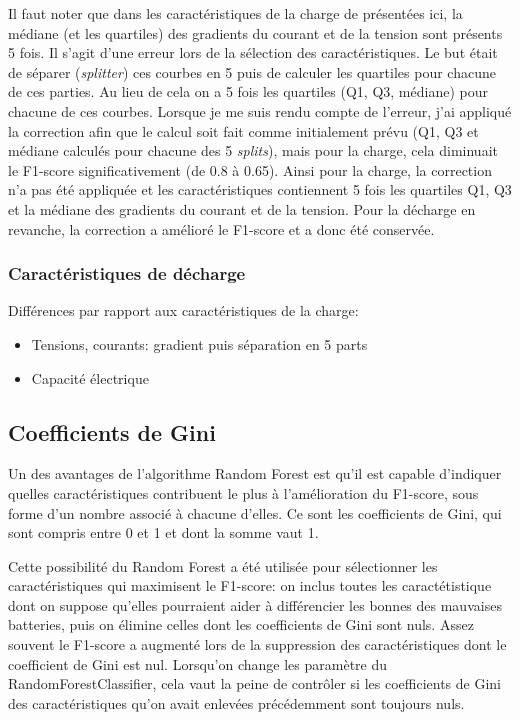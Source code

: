 Il faut noter que dans les caractéristiques de la charge de présentées ici, la médiane (et les quartiles) des gradients du courant et de la tension sont présents 5 fois. Il s'agit d'une erreur lors de la sélection des caractéristiques. Le but était de séparer (\textit{splitter}) ces courbes en 5 puis de calculer les quartiles pour chacune de ces parties. Au lieu de cela on a 5 fois les quartiles (Q1, Q3, médiane) pour chacune de ces courbes. Lorsque je me suis rendu compte de l'erreur, j'ai appliqué la correction afin que le calcul soit fait comme initialement prévu (Q1, Q3 et médiane calculés pour chacune des 5 \textit{splits}), mais pour la charge, cela diminuait le F1-score significativement (de 0.8 à 0.65). Ainsi pour la charge, la correction n'a pas été appliquée et les caractéristiques contiennent 5 fois les quartiles Q1, Q3 et la médiane des gradients du courant et de la tension. Pour la décharge en revanche, la correction a amélioré le F1-score et a donc été conservée.

\subsubsection{Caractéristiques de décharge}
Différences par rapport aux caractéristiques de la charge:
\begin{itemize}
    \item Tensions, courants: gradient puis séparation en 5 parts
    \item Capacité électrique
\end{itemize}

\subsection{Coefficients de Gini}
Un des avantages de l'algorithme Random Forest est qu'il est capable d'indiquer quelles caractéristiques contribuent le plus à l'amélioration du F1-score, sous forme d'un nombre associé à chacune d'elles. Ce sont les coefficients de Gini, qui sont compris entre 0 et 1 et dont la somme vaut 1.

Cette possibilité du Random Forest a été utilisée pour sélectionner les caractéristiques qui maximisent le F1-score: on inclus toutes les caractétistique dont on suppose qu'elles pourraient aider à différencier les bonnes des mauvaises batteries, puis on élimine celles dont les coefficients de Gini sont nuls. Assez souvent le F1-score a augmenté lors de la suppression des caractéristiques dont le coefficient de Gini est nul. Lorsqu'on change les paramètre du RandomForestClassifier, cela vaut la peine de contrôler si les coefficients de Gini des caractéristiques qu'on avait enlevées précédemment sont toujours nuls.

